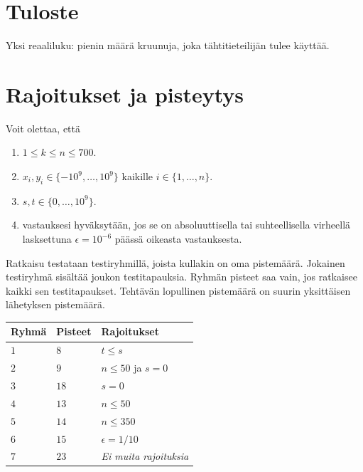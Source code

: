 \section*{Tuloste}

Yksi reaaliluku: pienin määrä kruunuja, joka tähtitieteilijän tulee käyttää.

\section*{Rajoitukset ja pisteytys} %

Voit olettaa, että
\begin{enumerate}
\item $1\leq k\leq n\leq 700$. %
\item $x_i, y_i\in \{-10^9,\ldots, 10^9\}$ kaikille $i\in\{1,\ldots,n\}$. %
\item $s,t\in \{0,\ldots, 10^9\}$. %
\item vastauksesi hyväksytään, jos se on absoluuttisella tai suhteellisella virheellä lasksettuna $\epsilon = 10^{-6}$ päässä oikeasta vastauksesta.
\end{enumerate}


Ratkaisu testataan testiryhmillä, joista kullakin on oma pistemäärä.
Jokainen testiryhmä sisältää joukon testitapauksia.
Ryhmän pisteet saa vain, jos ratkaisee kaikki sen testitapaukset.
Tehtävän lopullinen pistemäärä on suurin yksittäisen lähetyksen pistemäärä.

\medskip
\noindent
\begin{tabular}{lll}
  Ryhmä & Pisteet & Rajoitukset\\\hline
  $1$ & $8$ &  $t\leq s$\\
  $2$ & $9$ & $n\le 50$ ja $s=0$\\
  $3$ & $18$ & $s=0$\\
  $4$ & $13$ & $n\leq 50$\\
  $5$ & $14$ & $n\leq 350$\\
  $6$ & $15$ & $\epsilon = 1/10$\\
  $7$ & $23$ & \emph{Ei muita rajoituksia}\\
\end{tabular}
